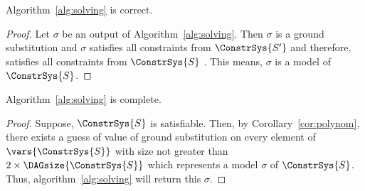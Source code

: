 \begin{prop}
	Algorithm~\ref{alg:solving} is correct.
\begin{proof}
Let $\sigma$ be an output of Algorithm~\ref{alg:solving}. Then $\sigma$ is a ground substitution and $\sigma$ satisfies all constraints from $\ConstrSys{S'}$ and therefore, satisfies all constraints from $\ConstrSys{S}$ . This means, $\sigma$ is a model of $\ConstrSys{S}$.
\end{proof}

\end{prop}

\begin{prop}
	Algorithm~\ref{alg:solving} is complete.
\begin{proof}
Suppose, $\ConstrSys{S}$ is satisfiable.  Then, by Corollary~\ref{cor:polynom}, there exists a guess of value of ground substitution on every element of $\vars{\ConstrSys{S}}$  with size not greater than  $2\times\DAGsize{\ConstrSys{S}}$ which represents a model $\sigma$ of $\ConstrSys{S}$. Thus, algorithm~\ref{alg:solving} will return this $\sigma$.

\end{proof}

\end{prop}
